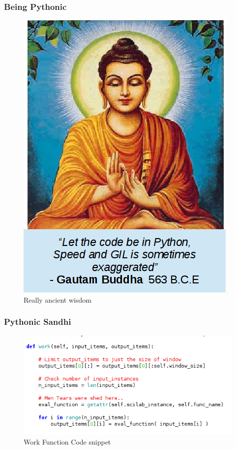\documentclass{beamer}
\begin{document}
\begin{frame}
    \frametitle{Being Pythonic}

    \begin{figure}
        \centering
        \begin{minipage}{.5\textwidth}
            \centering
            \includegraphics[width=.9\linewidth]{my_img/gautam_buddha_large2.png}
            \caption{Really ancient wisdom}
        \end{minipage}%
    \end{figure}

\end{frame}

\begin{frame}
        \frametitle{Pythonic Sandhi}
    \begin{figure}
        \centering
        \begin{minipage}{.5\textwidth}
            \centering
            \includegraphics[width=.9\linewidth]{my_img/wf_code_snipped.png}
            \caption{Work Function Code snippet}
        \end{minipage}%
    \end{figure}

\end{frame}
\end{document}
